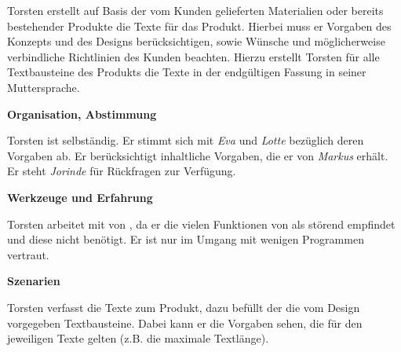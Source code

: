 \begin{multicols}{2}

\begin{center}
\end{center}


Torsten erstellt auf Basis der vom Kunden gelieferten Materialien oder bereits bestehender Produkte die Texte für das Produkt. Hierbei muss er Vorgaben des Konzepts und des Designs berücksichtigen, sowie Wünsche und möglicherweise verbindliche Richtlinien des Kunden beachten. Hierzu erstellt Torsten für alle Textbausteine des Produkts die Texte in der endgültigen Fassung in seiner Muttersprache.

\textbf{Organisation, Abstimmung}

Torsten ist selbständig. Er stimmt sich mit \emph{Eva} und \emph{Lotte} bezüglich deren Vorgaben ab. Er berücksichtigt inhaltliche Vorgaben, die er von \emph{Markus} erhält. Er steht  \emph{Jorinde} für Rückfragen zur Verfügung.

\textbf{Werkzeuge und Erfahrung}

Torsten arbeitet mit  von , da er die vielen Funktionen von  als störend empfindet und diese nicht benötigt. Er ist nur im Umgang mit wenigen Programmen vertraut.

\columnbreak

\textbf{Szenarien}

Torsten verfasst die Texte zum Produkt, dazu befüllt der die vom Design vorgegeben Textbausteine. Dabei kann er die Vorgaben sehen, die für den jeweiligen Texte gelten (z.B. die maximale Textlänge). 


\end{multicols}
